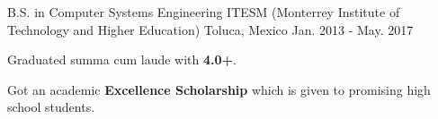 \begin{cventries}
  \cventry
    {B.S. in Computer Systems Engineering}
    {ITESM (Monterrey Institute of Technology and Higher Education)}
    {Toluca, Mexico}
    {Jan. 2013 - May. 2017}
    {
      \begin{cvitems}
        \item {Graduated summa cum laude with \textbf{4.0+}. }
        \item {Got an academic \textbf{Excellence Scholarship} which is given to promising high school students.}
      \end{cvitems}
    }
\end{cventries}

